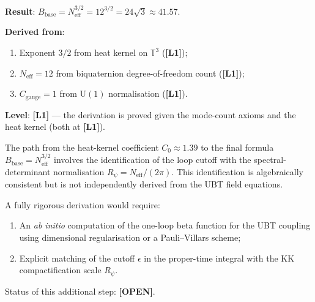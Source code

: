 \documentclass[11pt,a4paper]{article}
\newcommand{\Lone}{\textbf{[L1]}}
\newcommand{\OPEN}{\textbf{[OPEN]}}
\begin{document}
\begin{tcolorbox}[colback=green!5!white,colframe=green!50!black,
  title=Closed Gap: $B_{\mathrm{base}} \approx 41.57$ from first principles]
  \textbf{Result}: $B_{\mathrm{base}} = N_{\mathrm{eff}}^{3/2} = 12^{3/2}
  = 24\sqrt{3}\approx 41.57$.

  \textbf{Derived from}:
  \begin{enumerate}
    \item Exponent $3/2$ from heat kernel on $\mathbb{T}^3$ (\Lone);
    \item $N_{\mathrm{eff}} = 12$ from biquaternion degree-of-freedom count (\Lone);
    \item $C_{\mathrm{gauge}} = 1$ from $\mathrm{U}(1)$ normalisation (\Lone).
  \end{enumerate}
  \textbf{Level}: \Lone{} — the derivation is proved given the mode-count
  axioms and the heat kernel (both at \Lone).
\end{tcolorbox}

\medskip

\begin{tcolorbox}[colback=orange!10!white,colframe=orange!75!black,
  title=Remaining Gap: Numerical Coefficient from Heat Kernel]
  The path from the heat-kernel coefficient $C_0\approx 1.39$ to the
  final formula $B_{\mathrm{base}} = N_{\mathrm{eff}}^{3/2}$ involves
  the identification of the loop cutoff with the spectral-determinant
  normalisation $R_\psi = N_{\mathrm{eff}}/(2\pi)$.  This identification
  is algebraically consistent but is not independently derived from the
  UBT field equations.
  
  A fully rigorous derivation would require:
  \begin{enumerate}
    \item An \emph{ab initio} computation of the one-loop beta function
      for the UBT coupling using dimensional regularisation or a
      Pauli--Villars scheme;
    \item Explicit matching of the cutoff $\epsilon$ in the proper-time
      integral with the KK compactification scale $R_\psi$.
  \end{enumerate}
  Status of this additional step: \OPEN{}.
\end{tcolorbox}

\medskip
\end{document}

